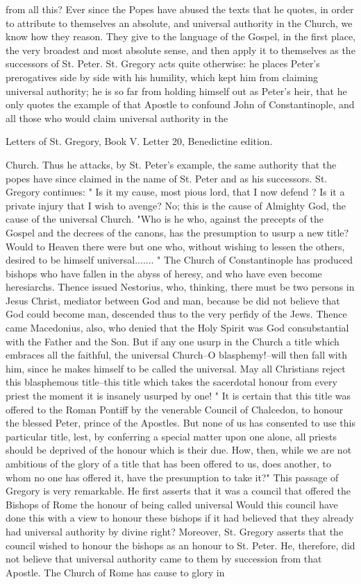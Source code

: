 from all this? Ever since the Popes have abused the texts that he quotes, in order to attribute to themselves an absolute, and universal authority in the Church, we know how they reason. They give to the language of the Gospel, in the first place, the very broadest and most absolute sense, and then apply it to themselves as the successors of St. Peter. St. Gregory acts quite otherwise: he places Peter's prerogatives side by side with his humility, which kept him from claiming universal authority; he is so far from holding himself out as Peter's heir, that he only quotes the example of that Apostle to confound John of Constantinople, and all those who would claim universal authority in the

Letters of St. Gregory, Book V. Letter 20, Benedictine edition.

Church. Thus he attacks, by St. Peter's example, the same authority that the popes have since claimed in the name of St. Peter and as his successors. St. Gregory continues: " Is it my cause, most pious lord, that I now defend ? Is it a private injury that I wish to avenge? No; this is the cause of Almighty God, the cause of the universal Church. "Who is he who, against the precepts of the Gospel and the decrees of the canons, has the presumption to usurp a new title? Would to Heaven there were but one who, without wishing to lessen the others, desired to be himself universal....... " The Church of Constantinople has produced bishops who have fallen in the abyss of heresy, and who have even become heresiarchs. Thence issued Nestorius, who, thinking, there must be two persons in Jesus Christ, mediator between God and man, because be did not believe that God could become man, descended thus to the very perfidy of the Jews. Thence came Macedonius, also, who denied that the Holy Spirit was God consubstantial with the Father and the Son. But if any one usurp in the Church a title which embraces all the faithful, the universal Church--O blasphemy!--will then fall with him, since he makes himself to be called the universal. May all Christians reject this blasphemous title--this title which takes the sacerdotal honour from every priest the moment it is insanely usurped by one! " It is certain that this title was offered to the Roman Pontiff by the venerable Council of Chalcedon, to honour the blessed Peter, prince of the Apostles. But none of us has consented to use this particular title, lest, by conferring a special matter upon one alone, all priests should be deprived of the honour which is their due. How, then, while we are not ambitious of the glory of a title that has been offered to us, does another, to whom no one has offered it, have the presumption to take it?" This passage of Gregory is very remarkable. He first asserts that it was a council that offered the Bishops of Rome the honour of being called universal Would this council have done this with a view to honour these bishops if it had believed that they already had universal authority by divine right? Moreover, St. Gregory asserts that the council wished to honour the bishops as an honour to St. Peter. He, therefore, did not believe that universal authority came to them by succession from that Apostle. The Church of Rome has cause to glory in 